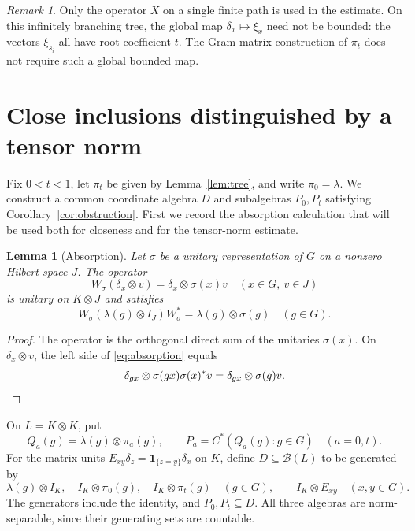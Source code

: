 \documentclass[11pt]{article}
\newtheorem{lemma}[theorem]{Lemma}
\theoremstyle{definition}
\theoremstyle{remark}
\newtheorem{remark}[theorem]{Remark}
\newcommand{\B}{\mathcal B}
\newcommand{\id}{I}
\begin{document}
\begin{remark}
Only the operator $X$ on a single finite path is used in the estimate.
On this infinitely branching tree, the global map
$\delta_x\mapsto\xi_x$ need not be bounded: the vectors
$\xi_{s_i}$ all have root coefficient $t$. The Gram-matrix construction
of $\pi_t$ does not require such a global bounded map.
\end{remark}

\section{Close inclusions distinguished by a tensor norm}\label{sec:inclusions}

Fix $0<t<1$, let $\pi_t$ be given by Lemma~\ref{lem:tree}, and write
$\pi_0=\lambda$. We construct a common coordinate algebra $D$ and
subalgebras $P_0,P_t$ satisfying Corollary~\ref{cor:obstruction}.
First we record the absorption calculation that will be used both for
closeness and for the tensor-norm estimate.

\begin{lemma}[Absorption]\label{lem:absorption}
Let $\sigma$ be a unitary representation of $G$ on a nonzero Hilbert space
$J$. The operator
\[
W_\sigma(\delta_x\otimes v)=\delta_x\otimes\sigma(x)v
\quad(x\in G,\ v\in J)
\]
is unitary on $K\otimes J$ and satisfies
\begin{equation}\label{eq:absorption}
W_\sigma(\lambda(g)\otimes\id_J)W_\sigma^*
=\lambda(g)\otimes\sigma(g)\quad(g\in G).
\end{equation}
\end{lemma}

\begin{proof}
The operator is the orthogonal direct sum of the unitaries $\sigma(x)$.
On $\delta_x\otimes v$, the left side of \eqref{eq:absorption} equals
\[
\delta_{gx}\otimes\sigma(gx)\sigma(x)^*v
=\delta_{gx}\otimes\sigma(g)v.
\qedhere
\]
\end{proof}

On $L=K\otimes K$, put
\begin{equation}\label{eq:P}
Q_a(g)=\lambda(g)\otimes\pi_a(g),\qquad
P_a=C^*(Q_a(g):g\in G)\quad(a=0,t).
\end{equation}
For the matrix units $E_{xy}\delta_z=\mathbf1_{\{z=y\}}\delta_x$ on $K$,
define $D\subseteq\B(L)$ to be generated by
\begin{equation}\label{eq:D}
\lambda(g)\otimes\id_K,\quad \id_K\otimes\pi_0(g),\quad
\id_K\otimes\pi_t(g)\quad(g\in G),
\qquad \id_K\otimes E_{xy}\quad(x,y\in G).
\end{equation}
The generators include the identity, and $P_0,P_t\subseteq D$.
All three algebras are norm-separable, since their generating sets are
countable.
\end{document}
